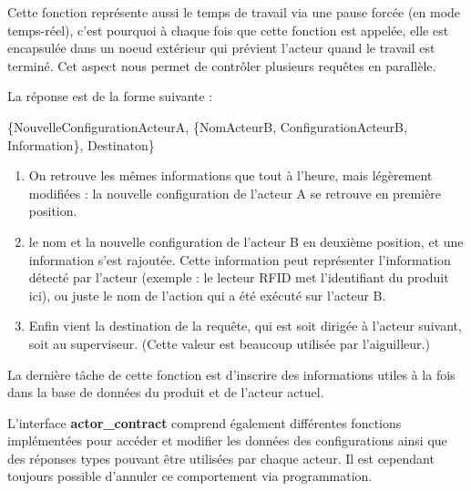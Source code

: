 \documentclass[12pt,a4paper]{article}
\begin{document}
	 	Cette fonction représente aussi le temps de travail via une pause
	 	forcée (en mode temps-réel), c'est pourquoi à chaque fois que cette 
	 	fonction est appelée,
	 	elle est encapsulée dans un noeud extérieur qui prévient l'acteur 
	 	quand le travail est terminé. Cet aspect nous permet de contrôler 
	 	plusieurs requêtes en parallèle.

	 	La réponse est de la forme suivante :

	 	\{NouvelleConfigurationActeurA, 
	 	\{NomActeurB, ConfigurationActeurB, Information\},
	 	Destinaton\}

	 	\begin{enumerate}
	 		\item On retrouve les mêmes informations que tout à l'heure, mais 
	 			légèrement modifiées : la nouvelle configuration de l'acteur A 
	 			se retrouve en première position.
	 		\item le nom et la nouvelle configuration de l'acteur B en deuxième 
	 			position, et une information s'est rajoutée. Cette information 
	 			peut représenter l'information détecté par l'acteur (exemple : 
	 			le lecteur RFID met l'identifiant du produit ici), ou juste le 
	 			nom de l'action qui a été exécuté sur l'acteur B.
	 		\item Enfin vient la destination de la requête, qui est soit dirigée 
	 			à l'acteur suivant, soit au superviseur. (Cette valeur est 
	 			beaucoup utilisée par l'aiguilleur.)
	 	\end{enumerate}

	 	La dernière tâche de cette fonction est d'inscrire des informations 
	 	utiles à la fois dans la base de données du produit et de l'acteur
	 	actuel.

		L'interface \textbf{actor\_contract} comprend également différentes 
		fonctions implémentées pour accéder et modifier les données des 
		configurations ainsi que des réponses types pouvant être utilisées 
		par chaque acteur. Il est cependant toujours possible d'annuler ce 
		comportement via programmation.
	 
\end{document}
